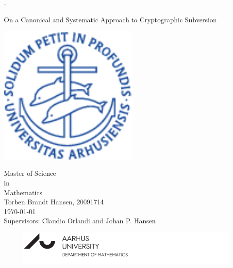 %
%

  \calccentering{\unitlength}
  \begin{adjustwidth*}{\unitlength}{-\unitlength}
    \vspace*{2cm}
    \centering
    \scshape
    
    {\huge
    On a Canonical and Systematic Approach to Cryptographic Subversion \\
    \vspace*{\onelineskip} 
    }
    
    \vspace*{4\onelineskip}
    
	\includegraphics[width=7cm,height=7cm]{segla1b}    
	
	\vspace*{3\onelineskip}
    
    {\large
    \linespread{1.4}\selectfont
    
    Master of Science\\
    in\\
    Mathematics \\
    \vspace{10mm}
        Torben Brandt Hansen, 20091714 \\
    	\today \\
    	Supervisors: Claudio Orlandi and Johan P. Hansen \\
 	}
    \begin{figure}[b]
		\centering
		\includegraphics[width=\textwidth]{alt-logo-t-1a171b-en}
	\end{figure}
    \strut\vfill
  \end{adjustwidth*}

